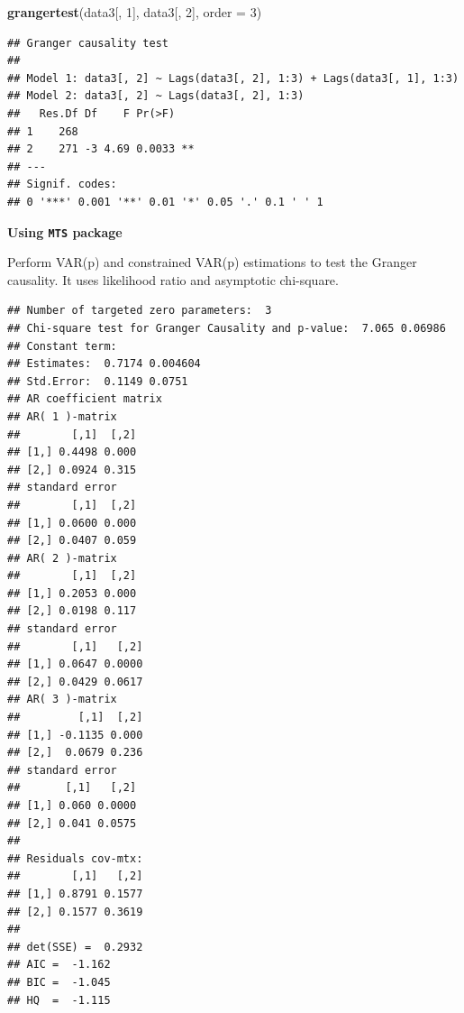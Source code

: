 \documentclass[]{book}
\newenvironment{Shaded}{\begin{snugshade}}{\end{snugshade}}
\newcommand{\DataTypeTok}[1]{\textcolor[rgb]{0.13,0.29,0.53}{#1}}
\newcommand{\DecValTok}[1]{\textcolor[rgb]{0.00,0.00,0.81}{#1}}
\newcommand{\KeywordTok}[1]{\textcolor[rgb]{0.13,0.29,0.53}{\textbf{#1}}}
\newcommand{\NormalTok}[1]{#1}
\newcommand{\OperatorTok}[1]{\textcolor[rgb]{0.81,0.36,0.00}{\textbf{#1}}}
\newcommand{\StringTok}[1]{\textcolor[rgb]{0.31,0.60,0.02}{#1}}
\begin{document}
\begin{Shaded}
\begin{Highlighting}[]
\KeywordTok{grangertest}\NormalTok{(data3[, }\DecValTok{1}\NormalTok{], data3[, }\DecValTok{2}\NormalTok{], }\DataTypeTok{order =} \DecValTok{3}\NormalTok{)}
\end{Highlighting}
\end{Shaded}

\begin{verbatim}
## Granger causality test
## 
## Model 1: data3[, 2] ~ Lags(data3[, 2], 1:3) + Lags(data3[, 1], 1:3)
## Model 2: data3[, 2] ~ Lags(data3[, 2], 1:3)
##   Res.Df Df    F Pr(>F)   
## 1    268                  
## 2    271 -3 4.69 0.0033 **
## ---
## Signif. codes:  
## 0 '***' 0.001 '**' 0.01 '*' 0.05 '.' 0.1 ' ' 1
\end{verbatim}

\textbf{Using \texttt{MTS} package}

Perform VAR(p) and constrained VAR(p) estimations to test the Granger causality. It uses likelihood ratio and asymptotic chi-square.

\begin{Shaded}
\end{Shaded}

\begin{verbatim}
## Number of targeted zero parameters:  3 
## Chi-square test for Granger Causality and p-value:  7.065 0.06986 
## Constant term: 
## Estimates:  0.7174 0.004604 
## Std.Error:  0.1149 0.0751 
## AR coefficient matrix 
## AR( 1 )-matrix 
##        [,1]  [,2]
## [1,] 0.4498 0.000
## [2,] 0.0924 0.315
## standard error 
##        [,1]  [,2]
## [1,] 0.0600 0.000
## [2,] 0.0407 0.059
## AR( 2 )-matrix 
##        [,1]  [,2]
## [1,] 0.2053 0.000
## [2,] 0.0198 0.117
## standard error 
##        [,1]   [,2]
## [1,] 0.0647 0.0000
## [2,] 0.0429 0.0617
## AR( 3 )-matrix 
##         [,1]  [,2]
## [1,] -0.1135 0.000
## [2,]  0.0679 0.236
## standard error 
##       [,1]   [,2]
## [1,] 0.060 0.0000
## [2,] 0.041 0.0575
##   
## Residuals cov-mtx: 
##        [,1]   [,2]
## [1,] 0.8791 0.1577
## [2,] 0.1577 0.3619
##   
## det(SSE) =  0.2932 
## AIC =  -1.162 
## BIC =  -1.045 
## HQ  =  -1.115
\end{verbatim}
\end{document}
